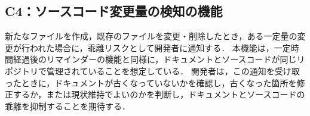 \subsection{C4：ソースコード変更量の検知の機能}
新たなファイルを作成，既存のファイルを変更・削除したとき，ある一定量の変更が行われた場合に，乖離リスクとして開発者に通知する．
本機能は，一定時間経過後のリマインダーの機能と同様に，ドキュメントとソースコードが同じリポジトリで管理されていることを想定している．
開発者は，この通知を受け取ったときに，ドキュメントが古くなっていないかを確認し，古くなった箇所を修正するか，または現状維持でよいのかを判断し，ドキュメントとソースコードの乖離を抑制することを期待する．
